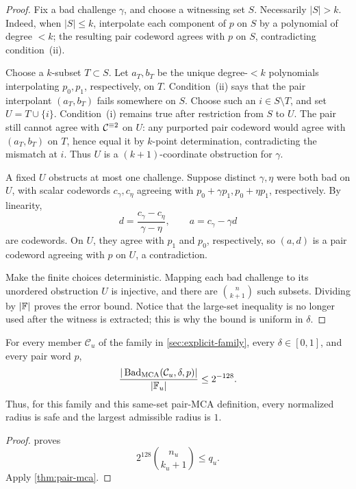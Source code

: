 \begin{proof}
Fix a bad challenge \(\gamma\), and choose a witnessing set \(S\).
Necessarily \(|S|>k\).  Indeed, when \(|S|\le k\), interpolate each component
of \(p\) on \(S\) by a polynomial of degree \(<k\); the resulting pair
codeword agrees with \(p\) on \(S\), contradicting condition~(ii).

Choose a \(k\)-subset \(T\subset S\).  Let \(a_T,b_T\) be the unique
degree-\(<k\) polynomials interpolating \(p_0,p_1\), respectively, on \(T\).
Condition~(ii) says that the pair interpolant \((a_T,b_T)\) fails somewhere
on \(S\). Choose such an \(i\in S\setminus T\), and set
\(U=T\cup\{i\}\). Condition~(i) remains true after restriction from \(S\) to
\(U\). The pair still cannot agree with \(\mathcal C^{\equiv 2}\) on \(U\): any purported
pair codeword would agree with \((a_T,b_T)\) on \(T\), hence equal it by
\(k\)-point determination, contradicting the mismatch at \(i\).
Thus \(U\) is a \((k+1)\)-coordinate obstruction for \(\gamma\).

A fixed \(U\) obstructs at most one challenge. Suppose distinct
\(\gamma,\eta\) were both bad on \(U\), with scalar codewords
\(c_\gamma,c_\eta\) agreeing with
\(p_0+\gamma p_1,p_0+\eta p_1\), respectively. By linearity,
\[
  d=\frac{c_\gamma-c_\eta}{\gamma-\eta},
  \qquad
  a=c_\gamma-\gamma d
\]
are codewords. On \(U\), they agree with \(p_1\) and \(p_0\), respectively,
so \((a,d)\) is a pair codeword agreeing with \(p\) on \(U\), a
contradiction.

Make the finite choices deterministic. Mapping each bad challenge to its
unordered obstruction \(U\) is injective, and there are
\(\binom n{k+1}\) such subsets.
Dividing by \(|\mathbb{F}|\) proves the error bound.  Notice that the large-set
inequality is no longer used after the witness is extracted; this is why the
bound is uniform in \(\delta\).
\end{proof}

\begin{corollary}
\label{cor:explicit-family-mca}
For every member \(\mathcal C_u\) of the family in
\cref{sec:explicit-family}, every \(\delta\in[0,1]\), and every pair word
\(p\),
\[
  \frac{|\operatorname{Bad}_{\operatorname{MCA}}(\mathcal C_u,\delta,p)|}{|\mathbb{F}_u|}
  \le 2^{-128}.
\]
Thus, for this family and this same-set pair-MCA definition, every normalized
radius is safe and the largest admissible radius is \(1\).
\end{corollary}

\begin{proof}
 proves
\[
  2^{128}\binom{n_u}{k_u+1}\le q_u.
\]
Apply \cref{thm:pair-mca}.
\end{proof}

